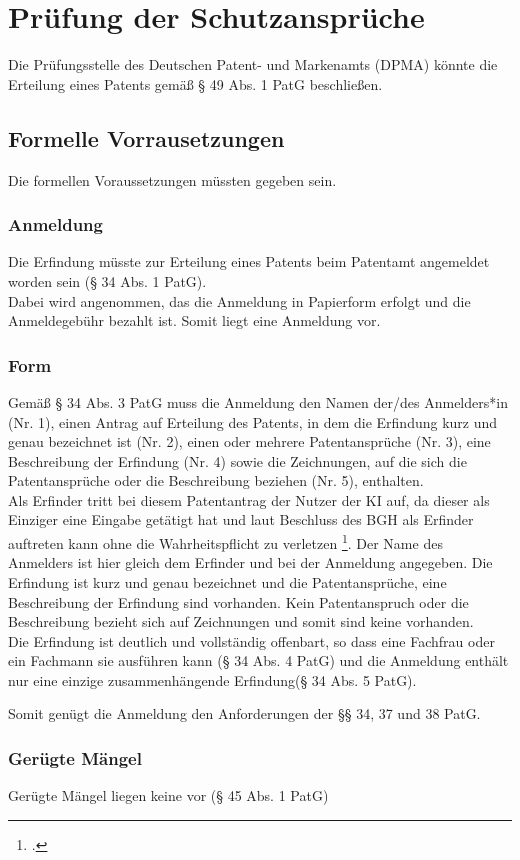 \section{Prüfung der Schutzansprüche}
Die Prüfungsstelle des Deutschen Patent- und Markenamts (DPMA) könnte die Erteilung eines
Patents gemäß § 49 Abs. 1 PatG beschließen.
\subsection{Formelle Vorrausetzungen}
Die formellen Voraussetzungen müssten gegeben sein.
\subsubsection{Anmeldung}
Die Erfindung müsste zur Erteilung eines Patents beim Patentamt angemeldet worden sein (§ 34 Abs.
1 PatG).
\\
Dabei wird angenommen,
das die Anmeldung in Papierform erfolgt und die Anmeldegebühr bezahlt ist. 
Somit liegt eine Anmeldung vor.
\subsubsection{Form}
Gemäß § 34 Abs. 3 PatG muss die Anmeldung den Namen der/des Anmelders*in (Nr. 1), einen
Antrag auf Erteilung des Patents, in dem die Erfindung kurz und genau bezeichnet ist (Nr. 2), einen
oder mehrere Patentansprüche (Nr. 3), eine Beschreibung der Erfindung (Nr. 4) sowie die
Zeichnungen, auf die sich die Patentansprüche oder die Beschreibung beziehen (Nr. 5), enthalten.
\\
Als Erfinder tritt bei diesem Patentantrag der Nutzer der
KI auf, da dieser als Einziger eine Eingabe getätigt hat und
laut Beschluss des BGH als Erfinder auftreten kann ohne die Wahrheitspflicht
zu verletzen \footcite{BPatG21122021}. 
Der Name des Anmelders ist hier gleich dem Erfinder und bei der
Anmeldung angegeben. 
Die Erfindung ist kurz und genau bezeichnet und die Patentansprüche, 
eine Beschreibung der Erfindung
sind vorhanden. 
Kein Patentanspruch oder die Beschreibung bezieht sich auf Zeichnungen
und somit sind keine vorhanden.
\\
Die Erfindung ist deutlich und vollständig offenbart, 
so dass eine Fachfrau
oder ein Fachmann sie ausführen kann (§ 34 Abs. 4 PatG) und die
Anmeldung enthält nur eine einzige zusammenhängende Erfindung(§ 34 Abs. 5 PatG). 

Somit genügt die Anmeldung den Anforderungen der §§ 34, 37 und 38 PatG.
\subsubsection{Gerügte Mängel}
Gerügte Mängel liegen keine vor (§ 45 Abs. 1 PatG)
